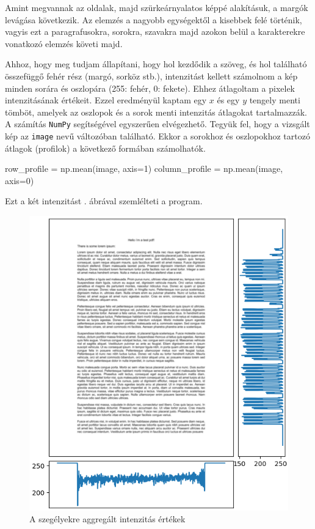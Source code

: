 
Amint megvannak az oldalak, majd szürkeárnyalatos képpé alakításuk, a margók levágása következik. Az elemzés a nagyobb egységektől a kisebbek felé történik, vagyis ezt a paragrafusokra, sorokra, szavakra majd azokon belül a karakterekre vonatkozó elemzés követi majd.

Ahhoz, hogy meg tudjam állapítani, hogy hol kezdődik a szöveg, és hol található összefüggő fehér rész (margó, sorköz stb.), intenzitást kellett számolnom a kép minden sorára és oszlopára (255: fehér, 0: fekete). Ehhez átlagoltam a pixelek intenzitásának értékeit. Ezzel eredményül kaptam egy $x$ és egy $y$ tengely menti tömböt, amelyek az oszlopok és a sorok menti intenzitás átlagokat tartalmazzák.
A számítás \texttt{NumPy} segítségével egyszerűen elvégezhető.
Tegyük fel, hogy a vizsgált kép az \texttt{image} nevű változóban található.
Ekkor a sorokhoz és oszlopokhoz tartozó átlagok (profilok) a következő formában számolhatók.
\begin{python}
row_profile = np.mean(image, axis=1)
column_profile = np.mean(image, axis=0)
\end{python}
Ezt a két intenzitást . ábrával szemlélteti a program.

\begin{figure}[h!]
\centering
\includegraphics[scale=1]{images/mf_2.png}
\caption{A szegélyekre aggregált intenzitás értékek}
\label{fig:mf_2}
\end{figure}

